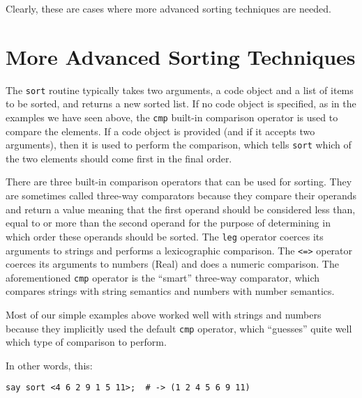 Clearly, these are cases where more advanced sorting 
techniques are needed. 

\section{More Advanced Sorting Techniques}
\label{advanced_sort}

The {\tt sort} routine typically takes two arguments, 
a code object and a list of items to be sorted, and returns 
a new sorted list. If no code object is specified, as in the 
examples we have seen above, the {\tt cmp} built-in comparison 
operator is used to compare the elements. If 
a code object is provided (and if it accepts two 
arguments), then it is used to perform the comparison, 
which tells {\tt sort} which of the two elements should 
come first in the final order.

There are three built-in comparison operators that can be used 
for sorting. They are sometimes called three-way comparators 
because they compare their operands and return a value meaning 
that the first operand should be considered less than, equal to 
or more than the second operand for the purpose of determining 
in which order these operands should be sorted. The {\tt leg} 
operator coerces its arguments to strings and performs a 
lexicographic comparison. The \verb'<=>' operator coerces 
its arguments to numbers (Real) and does a numeric comparison. 
The aforementioned {\tt cmp} operator is the ``smart'' 
three-way comparator, which compares strings with string 
semantics and numbers with number semantics.

Most of our simple examples above worked well with 
strings and numbers because they implicitly used the 
default {\tt cmp} operator, which ``guesses'' quite 
well which type of comparison to perform.

\ifplastex \else
{}
\fi



In other words, this:

\begin{verbatim}
say sort <4 6 2 9 1 5 11>;  # -> (1 2 4 5 6 9 11)
\end{verbatim}

